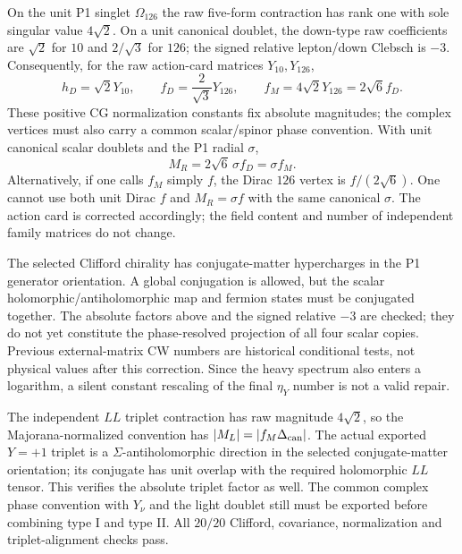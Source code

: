 \documentclass[11pt]{article}
\begin{document}
On the unit P1 singlet $\Omega_{126}$ the raw five-form contraction has
rank one with sole singular value $4\sqrt2$. On a unit canonical
doublet, the down-type raw coefficients are $\sqrt2$ for $10$ and
$2/\sqrt3$ for $126$; the signed relative lepton/down Clebsch is $-3$.
Consequently, for the raw action-card matrices $Y_{10},Y_{126}$,
\begin{equation}
 \boxed{h_D=\sqrt2Y_{10},\qquad f_D=\frac2{\sqrt3}Y_{126},\qquad
 f_M=4\sqrt2Y_{126}=2\sqrt6 f_D.}
\end{equation}
These positive CG normalization constants fix absolute magnitudes; the
complex vertices must also carry a common scalar/spinor phase convention.
With unit canonical scalar doublets and the P1 radial $\sigma$,
\begin{equation}
 \boxed{M_R=2\sqrt6\,\sigma f_D=\sigma f_M.}
\end{equation}
Alternatively, if one calls $f_M$ simply $f$, the Dirac $126$ vertex is
$f/(2\sqrt6)$. One cannot use both unit Dirac $f$ and $M_R=\sigma f$
with the same canonical $\sigma$. The action card is corrected accordingly;
the field content and number of independent family matrices do not change.

The selected Clifford chirality has conjugate-matter hypercharges in the
P1 generator orientation. A global conjugation is allowed, but the scalar
holomorphic/antiholomorphic map and fermion states must be conjugated
together. The absolute factors above and the signed relative $-3$ are
checked; they do not yet constitute the phase-resolved projection of all
four scalar copies. Previous external-matrix CW numbers are historical
conditional tests, not physical values after this correction. Since the
heavy spectrum also enters a logarithm, a silent constant rescaling of
the final $\eta_Y$ number is not a valid repair.

The independent $LL$ triplet contraction has raw magnitude $4\sqrt2$,
so the Majorana-normalized convention has
$|M_L|=|f_M\Delta_{\rm can}|$. The actual exported $Y=+1$ triplet
is a $\Sigma$-antiholomorphic direction in the selected conjugate-matter
orientation; its conjugate has unit overlap with the required
holomorphic $LL$ tensor. This verifies the absolute triplet factor as
well. The common complex phase convention with $Y_\nu$ and the light
doublet still must be exported before combining type I and type II.
All $20/20$ Clifford, covariance, normalization and triplet-alignment
checks pass.
\end{document}
